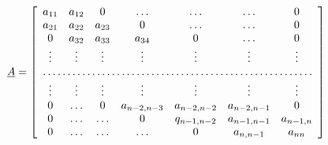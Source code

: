 \documentclass{article}
\begin{document}
\setlength\delimitershortfall{-1pt}
\begin{align}
\underline{A} &= \left[\begin{array}{*7c}
    a_{11} & a_{12} & 0 & \ldots & \ldots & \ldots & 0\\
    a_{21} & a_{22} & a_{23} & 0 & \ldots & \ldots & 0\\
    0 & a_{32} & a_{33} & a_{34} & 0 & \ldots & 0\\
    \vdots & \vdots & \vdots & \vdots & \vdots & \vdots & \vdots\\
    \hdotsfor{7}\\
    \vdots & \vdots & \vdots & \vdots & \vdots & \vdots & \vdots\\
    0 & \ldots & 0 & a_{n-2,n-3} & a_{n-2,n-2} & a_{n-2,n-1} & 0\\
    0 & \ldots & \ldots & 0 & q_{n-1,n-2} & a_{n-1,n-1} & a_{n-1,n}\\
    0 & \ldots & \ldots & \ldots & 0 & a_{n,n-1} & a_{nn}
  \end{array}\right]
\end{align}
\end{document}
